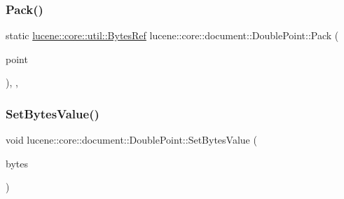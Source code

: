\subsubsection{\texorpdfstring{Pack()}{Pack()}}
{\footnotesize\ttfamily static \mbox{\hyperlink{classlucene_1_1core_1_1util_1_1BytesRef}{lucene\+::core\+::util\+::\+Bytes\+Ref}} lucene\+::core\+::document\+::\+Double\+Point\+::\+Pack (\begin{DoxyParamCaption}\item[{\mbox{\hyperlink{ZlibCrc32_8h_a2c212835823e3c54a8ab6d95c652660e}{const}} std\+::initializer\+\_\+list$<$ \mbox{\hyperlink{ZlibCrc32_8h_a2c212835823e3c54a8ab6d95c652660e}{const}} double $>$ \&}]{point }\end{DoxyParamCaption})\hspace{0.3cm}{\ttfamily [inline]}, {\ttfamily [static]}, {\ttfamily [private]}}

\mbox{\label{classlucene_1_1core_1_1document_1_1DoublePoint_af6162d3a002e5cd557b63afea4efee1e}} 
\subsubsection{\texorpdfstring{Set\+Bytes\+Value()}{SetBytesValue()}}
{\footnotesize\ttfamily void lucene\+::core\+::document\+::\+Double\+Point\+::\+Set\+Bytes\+Value (\begin{DoxyParamCaption}\item[{\mbox{\hyperlink{ZlibCrc32_8h_a2c212835823e3c54a8ab6d95c652660e}{const}} \mbox{\hyperlink{classlucene_1_1core_1_1util_1_1BytesRef}{lucene\+::core\+::util\+::\+Bytes\+Ref}}}]{bytes }\end{DoxyParamCaption})\hspace{0.3cm}{\ttfamily [inline]}}

\mbox{\label{classlucene_1_1core_1_1document_1_1DoublePoint_a71a14c1578c356e006c422f2c8a267b8}} 
